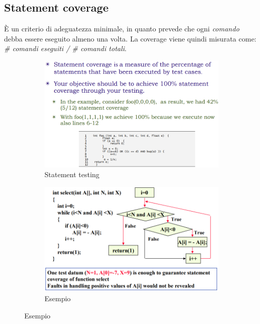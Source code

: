 \documentclass[a4paper,oneside,titlepage]{book}
\begin{document}
\subsection{Statement coverage}
\`{E} un criterio di adeguatezza minimale, in quanto prevede che ogni \textit{comando} debba essere eseguito almeno una volta. La coverage viene quindi misurata come: \textit{\# comandi eseguiti / \# comandi totali}.
\begin{figure}[htp]
	\begin{subfigure}{0.49\textwidth}
	    \centering
		\includegraphics[width=\textwidth, height=\textheight, keepaspectratio]{statement1.png}
		\caption{Statement testing}
	\end{subfigure}
	\hfill
	\begin{subfigure}{0.49\textwidth}
	    \centering
		\includegraphics[width=\textwidth, height=\textheight, keepaspectratio]{statement2.png} 
		\caption{Esempio}
	\end{subfigure}
\end{figure}
\end{document}
